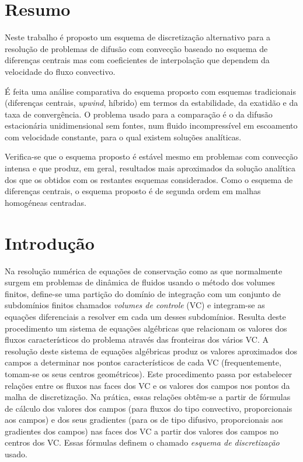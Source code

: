 \documentclass[11pt,twoside]{article}
\begin{document}
{\setlength{\parindent}{30pt}%

\small%
\section*{Resumo}
\smallskip
Neste trabalho é proposto um esquema de discretização alternativo para a
resolução de problemas de difusão com convecção baseado no esquema de diferenças
centrais mas com coeficientes de interpolação que dependem da velocidade do fluxo
convectivo.

É feita uma análise comparativa do esquema proposto com esquemas tradicionais
(diferenças centrais, \emph{upwind}, híbrido) em termos da estabilidade, da
exatidão e da taxa de convergência. O problema usado para a comparação é o da
difusão estacionária unidimensional sem fontes, num fluido incompressível em
escoamento com velocidade constante, para o qual existem soluções analíticas.

Verifica-se que o esquema proposto é estável mesmo em problemas com convecção
intensa e que produz, em geral, resultados mais aproximados da solução analítica
dos que os obtidos com os restantes esquemas considerados. Como o esquema de
diferenças centrais, o esquema proposto é de segunda ordem em malhas homogéneas
centradas.

\vspace{15pt}





\section{Introdução}
Na resolução numérica de equações de conservação como as que normalmente surgem
em problemas de dinâmica de fluidos usando o método dos volumes finitos,
define-se uma partição do domínio de integração com um conjunto de subdomínios
finitos chamados \emph{volumes de controle} (VC) e integram-se as equações
diferenciais a resolver em cada um desses subdomínios. Resulta deste
procedimento um sistema de equações algébricas que relacionam os valores dos
fluxos característicos do problema através das fronteiras dos vários VC. A
resolução deste sistema de equações algébricas produz os valores aproximados dos
campos a determinar nos pontos característicos de cada VC (frequentemente,
tomam-se os seus centros geométricos).  Este procedimento passa por estabelecer
relações entre os fluxos nas faces dos VC e os valores dos campos nos pontos da
malha de discretização. Na prática, essas relações obtêm-se a partir de
fórmulas de cálculo dos valores dos campos (para fluxos do tipo convectivo, proporcionais aos campos) e dos seus gradientes (para os de tipo difusivo, proporcionais aos gradientes dos campos) nas faces dos VC a partir dos valores dos campos no centros dos VC. Essas fórmulas definem o chamado \emph{esquema de discretização} usado.

}
\end{document}

